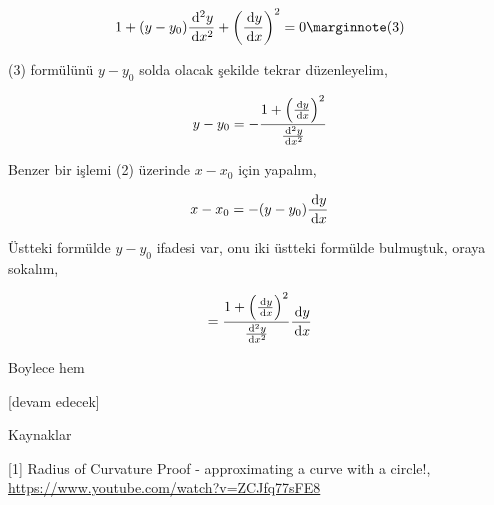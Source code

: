 \documentclass[12pt,fleqn]{article}\usepackage{../../common}
\begin{document}
$$
1 + (y-y_0) \frac{\ud^2y}{\ud x^2} +
\left( \frac{\ud y}{\ud x}  \right)^2 = 0
\mlabel{3}
$$

(3) formülünü $y-y_0$ solda olacak şekilde tekrar düzenleyelim,

$$
y-y_0 = - \frac{1 + \left( \frac{\,\mathrm{d} y}{\,\mathrm{d} x}  \right)^2}{\frac{\,\mathrm{d}^2y}{\,\mathrm{d} x^2}}
$$

Benzer bir işlemi (2) üzerinde $x-x_0$ için yapalım,

$$
x-x_0 = -(y-y_0)\frac{\,\mathrm{d} y}{\,\mathrm{d} x}
$$

Üstteki formülde $y-y_0$ ifadesi var, onu iki üstteki formülde bulmuştuk,
oraya sokalım,

$$
= \frac{1 + \left( \frac{\,\mathrm{d} y}{\,\mathrm{d} x}  \right)^2}{\frac{\,\mathrm{d}^2y}{\,\mathrm{d} x^2}}
\frac{\,\mathrm{d} y}{\,\mathrm{d} x}
$$

Boylece hem 


[devam edecek]

Kaynaklar

[1] Radius of Curvature Proof - approximating a curve with a circle!,
    \url{https://www.youtube.com/watch?v=ZCJfq77sFE8}
\end{document}
